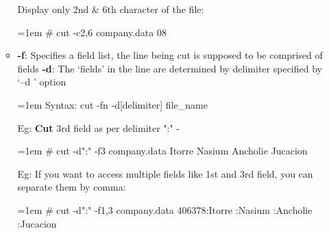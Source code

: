 \begin{flushleft}
\begin{itemize}
\begin{itemize}
		Display only 2nd \& 6th character of the file:
		\bigskip
		\begin{tcolorbox}[breakable,notitle,boxrule=-0pt,colback=black,colframe=black]
			\color{green}
			\font=1em
			\# cut -c2,6 company.data
			\newline
			\color{white}
			08
			\font=4pt
		\end{tcolorbox}		
		\item \textbf{-f}: Specifies a field list, the line being cut is supposed to be comprised of fields
		\newline
		\textbf{-d}: The ‘fields’ in the line are determined by delimiter specified by ‘–d ’ option
		\bigskip
		\begin{tcolorbox}[breakable,notitle,boxrule=-0pt,colback=pink,colframe=pink]
			\color{black}
			\font=1em
			Syntax: cut -fn -d[delimiter]  file\_name
			\font=4pt
		\end{tcolorbox}
		Eg: \textbf{Cut} 3rd field as per delimiter ":" -
		\bigskip
		\begin{tcolorbox}[breakable,notitle,boxrule=-0pt,colback=black,colframe=black]
			\color{green}
			\font=1em
			\# cut -d":" -f3 company.data
			\newline
			\color{white}
			Itorre
			\newline
			\color{white}
			Nasium
			\newline
			\color{white}
			Ancholie
			\newline
			\color{white}
			Jucacion
			\font=4pt
		\end{tcolorbox}		
		Eg: If you want to access multiple fields like 1st and 3rd field, you can separate them by comma:
		\bigskip
		\begin{tcolorbox}[breakable,notitle,boxrule=-0pt,colback=black,colframe=black]
			\color{green}
			\font=1em
			\# cut -d":" -f1,3 company.data
			\newline
			\color{white}
			406378:Itorre
			:Nasium
			:Ancholie
			:Jucacion
			\font=4pt
		\end{tcolorbox}				 
	\end{itemize}

		
	\end{itemize}

\end{flushleft}

\newpage

